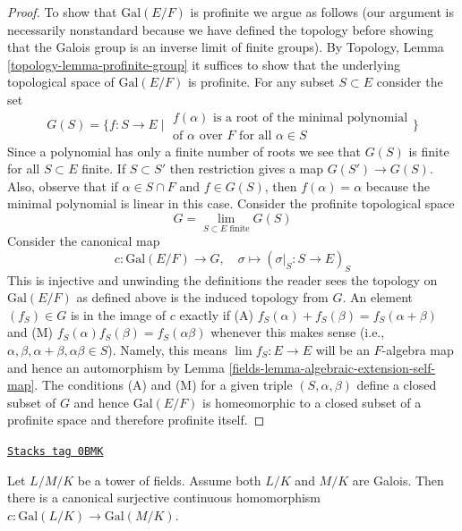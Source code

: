 \begin{proof}
\medskip\noindent
To show that $\text{Gal}(E/F)$ is profinite we argue as follows
(our argument is necessarily nonstandard because we have defined
the topology before showing that the Galois group is an inverse
limit of finite groups).
By Topology, Lemma \ref{topology-lemma-profinite-group}
it suffices to show that the underlying
topological space of $\text{Gal}(E/F)$ is profinite.
For any subset $S \subset E$ consider the set
$$
G(S) = \{ f : S \to E \mid
\begin{matrix}
f(\alpha)\text{ is a root of the minimal polynomial}\\
\text{of }\alpha\text{ over }F\text{ for all }\alpha \in S
\end{matrix}
\}
$$
Since a polynomial has only a finite number of roots we see that
$G(S)$ is finite for all $S \subset E$ finite. If $S \subset S'$
then restriction gives a map $G(S') \to G(S)$. Also, observe
that if $\alpha \in S \cap F$ and $f \in G(S)$, then $f(\alpha) = \alpha$
because the minimal polynomial is linear in this case.
Consider the profinite topological space
$$
G = \lim_{S \subset E\text{ finite}} G(S)
$$
Consider the canonical map
$$
c : \text{Gal}(E/F) \longrightarrow G,\quad
\sigma \longmapsto (\sigma|_S : S \to E)_S
$$
This is injective and unwinding the definitions the
reader sees the topology on $\text{Gal}(E/F)$ as defined above
is the induced topology from $G$. An element $(f_S) \in G$ is in
the image of $c$ exactly if
(A) $f_S(\alpha) + f_S(\beta) = f_S(\alpha + \beta)$ and
(M) $f_S(\alpha)f_S(\beta) = f_S(\alpha\beta)$ whenever
this makes sense (i.e.,
$\alpha, \beta, \alpha + \beta, \alpha\beta \in S$).
Namely, this means
$\lim f_S : E \to E$ will be an $F$-algebra map
and hence an automorphism by
Lemma \ref{fields-lemma-algebraic-extension-self-map}.
The conditions (A) and (M) for a given triple
$(S, \alpha, \beta)$ define a closed subset of
$G$ and hence $\text{Gal}(E/F)$ is homeomorphic
to a closed subset of a profinite space and therefore
profinite itself.
\end{proof}

\begin{lemma}
\label{fields-lemma-galois-infinite}
\href{https://stacks.math.columbia.edu/tag/0BMK}{\texttt{Stacks tag 0BMK}}

Let $L/M/K$ be a tower of fields. Assume both $L/K$ and
$M/K$ are Galois. Then there is a canonical surjective continuous
homomorphism $c : \text{Gal}(L/K) \to \text{Gal}(M/K)$.
\end{lemma}

